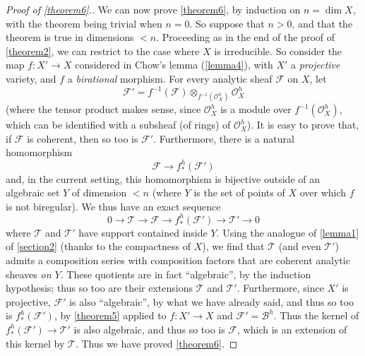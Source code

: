 \documentclass{article}
\theoremstyle{plain}
\theoremstyle{definition}
\newcommand{\sh}{\mathscr}
\newcommand{\oldpage}[1]{\marginpar{\footnotesize$\Big\vert$ \textit{p.~#1}}}
\begin{document}
\begin{proof}[Proof of \cref{theorem6}.]
  We can now prove \cref{theorem6}, by induction on $n=\dim X$, with the theorem being trivial when $n=0$.
  So suppose that $n>0$, and that the theorem is true in dimensions $<n$.
  Proceeding as in the end of the proof of \cref{theorem2}, we can restrict to the case where $X$ is irreducible.
  So consider the map $f\colon X'\to X$ considered in Chow's lemma (\cref{lemma4}), with $X'$ a \emph{projective} variety, and $f$ a \emph{birational} morphism.
  For every analytic sheaf $\sh{F}$ on $X$, let
  \[
    \sh{F}' = f^{-1}(\sh{F})\otimes_{f^{-1}(\sh{O}_X^h)}\sh{O}_X^h
  \]
  (where the tensor product makes sense, since $\sh{O}_X^h$ is a module over $f^{-1}(\sh{O}_X^h)$, which can be identified with a subsheaf (of rings) of $\sh{O}_X^h$).
  It is easy to prove that, if $\sh{F}$ is coherent, then so too is $\sh{F}'$.
  Furthermore, there is a natural homomorphism
  \oldpage{2-16}
  \[
    \sh{F} \to f_*^h(\sh{F}')
  \]
  and, in the current setting, this homomorphism is bijective outside of an algebraic set $Y$ of dimension $<n$ (where $Y$ is the set of points of $X$ over which $f$ is not biregular).
  We thus have an exact sequence
  \[
    0 \to \sh{T} \to \sh{F} \to f_*^h(\sh{F}') \to \sh{T}' \to 0
  \]
  where $\sh{T}$ and $\sh{T'}$ have support contained inside $Y$.
  Using the analogue of \cref{lemma1} of \cref{section2} (thanks to the compactness of $X$), we find that $\sh{T}$ (and even $\sh{T}'$) admits a composition series with composition factors that are coherent analytic sheaves \emph{on $Y$}.
  These quotients are in fact ``algebraic'', by the induction hypothesis;
  thus so too are their extensions $\sh{T}$ and $\sh{T}'$.
  Furthermore, since $X'$ is projective, $\sh{F}'$ is also ``algebraic'', by what we have already said, and thus so too is $f_*^h(\sh{F}')$, by \cref{theorem5} applied to $f\colon X'\to X$ and $\sh{F}'=\sh{B}^h$.
  Thus the kernel of $f_*^h(\sh{F}')\to\sh{T}'$ is also algebraic, and thus so too is $\sh{F}$, which is an extension of this kernel by $\sh{T}$.
  Thus we have proved \cref{theorem6}.
\end{proof}



\nocite{*}


\end{document}
